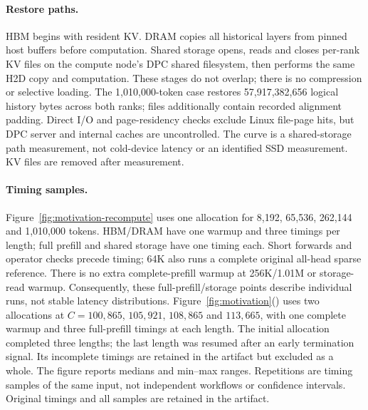 \documentclass[sigplan,10pt,anonymous,nonacm]{acmart}
\begin{document}
\paragraph{Restore paths.}
HBM begins with resident KV. DRAM copies all historical layers from
pinned host buffers before computation. Shared storage opens, reads and
closes per-rank KV files on the compute node's DPC shared filesystem,
then performs the same H2D copy and computation. These stages do not
overlap; there is no compression or selective loading. The 1,010,000-token
case restores 57,917,382,656 logical history bytes across both ranks;
files additionally contain recorded alignment padding. Direct I/O and
page-residency checks exclude Linux file-page hits, but DPC server and
internal caches are uncontrolled. The curve is a shared-storage path
measurement, not cold-device latency or an identified SSD measurement.
KV files are removed after measurement.

\paragraph{Timing samples.}
Figure~\ref{fig:motivation-recompute} uses one
allocation for 8,192, 65,536, 262,144 and 1,010,000 tokens. HBM/DRAM have
one warmup and three timings per length; full prefill and shared storage
have one timing each. Short forwards and operator checks precede timing;
64K also runs a complete original all-head sparse reference. There is
no extra complete-prefill warmup at 256K/1.01M or storage-read warmup.
Consequently, these full-prefill/storage points describe individual
runs, not stable latency distributions.
Figure~\ref{fig:motivation}() uses two allocations at
$C=100{,}865$, $105{,}921$, $108{,}865$ and $113{,}665$, with one complete
warmup and three full-prefill timings at each length. The initial allocation completed three lengths; the last length was
resumed after an early termination signal. Its incomplete timings are
retained in the artifact but excluded as a whole. The figure reports
medians and min--max ranges. Repetitions are timing samples of the same input,
not independent workflows or confidence intervals. Original timings and
all samples are retained in the artifact.
\end{document}
